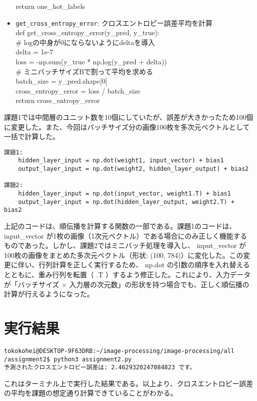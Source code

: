\documentclass[11px,a4paper]{jsarticle}
\begin{document}
\begin{itemize}
    return one\_hot\_labels\\
    \item \verb|get_cross_entropy_error|: クロスエントロピー誤差平均を計算\\
    def get\_cross\_entropy\_error(y\_pred, y\_true):\\
    \# logの中身が0にならないようにdeltaを導入\\
    delta = 1e-7\\
    loss = -np.sum(y\_true * np.log(y\_pred + delta)) \\
    \# ミニバッチサイズBで割って平均を求める\\
    batch\_size = y\_pred.shape[0]\\
    cross\_entropy\_error = loss / batch\_size\\
    return cross\_entropy\_error\\
\end{itemize}
課題1では中間層のユニット数を10個にしていたが、誤差が大きかったため100個に変更した。また、今回はバッチサイズ分の画像100枚を多次元ベクトルとして一括で計算した。

\begin{verbatim}
課題1:
    hidden_layer_input = np.dot(weight1, input_vector) + bias1
    output_layer_input = np.dot(weight2, hidden_layer_output) + bias2

課題2: 
    hidden_layer_input = np.dot(input_vector, weight1.T) + bias1
    output_layer_input = np.dot(hidden_layer_output, weight2.T) + bias2
\end{verbatim}
上記のコードは、順伝播を計算する関数の一部である。課題1のコードは、 input\_vector が1枚の画像（1次元ベクトル）である場合にのみ正しく機能するものであった。しかし、課題2ではミニバッチ処理を導入し、 input\_vector が100枚の画像をまとめた多次元ベクトル（形状: (100, 784)）に変化した。この変更に伴い、行列計算を正しく実行するため、 np.dot の引数の順序を入れ替えるとともに、重み行列を転置（ .T ）するよう修正した。これにより、入力データが「バッチサイズ × 入力層の次元数」の形状を持つ場合でも、正しく順伝播の計算が行えるようになった。

\section{実行結果}
\begin{verbatim}
tokokohei@DESKTOP-9F63DRB:~/image-processing/image-processing/all
/assignment2$ python3 assignment2.py 
予測されたクロスエントロピー誤差は: 2.4629320247084823 です。
\end{verbatim}
これはターミナル上で実行した結果である。以上より、クロスエントロピー誤差の平均を課題の想定通り計算できていることがわかる。
\end{document}
